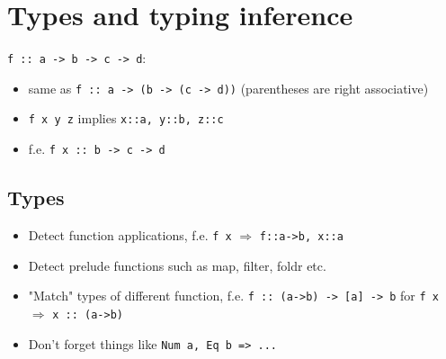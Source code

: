 \documentclass{article}
\begin{document}
\section{Types and typing inference}
\texttt{f :: a -> b -> c -> d}:
\begin{itemize}
    \item same as \texttt{f :: a -> (b -> (c -> d))} (parentheses are right associative) 
    \item \texttt{f x y z} implies \texttt{x::a, y::b, z::c} 
    \item f.e. \texttt{f x :: b -> c -> d}
\end{itemize}
\subsection{Types}
\begin{itemize}
    \item Detect function applications, f.e. \texttt{f x} $\Rightarrow$ \texttt{f::a->b, x::a}
    \item Detect prelude functions such as map, filter, foldr etc.
    \item "Match" types of different function, f.e. \texttt{f :: (a->b) -> [a] -> b} for  \texttt{f x} $\Rightarrow$ \texttt{x :: (a->b)}
    \item Don't forget things like \texttt{Num a, Eq b => ...}
\end{itemize}
\end{document}
